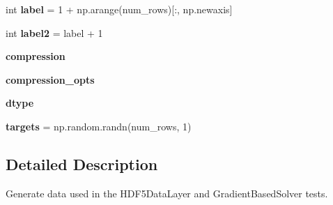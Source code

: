 \begin{DoxyCompactItemize}
int {\bfseries label} = 1 + np.\+arange(num\+\_\+rows)\mbox{[}\+:, np.\+newaxis\mbox{]}
\item 
\mbox{\label{namespacegenerate__sample__data_ad6ecf36c3dac6140a30b04fee35da3f2}} 
int {\bfseries label2} = label + 1
\item 
\mbox{\label{namespacegenerate__sample__data_aa357f9fa404423f5df718d8ba7bb6af7}} 
{\bfseries compression}
\item 
\mbox{\label{namespacegenerate__sample__data_a0f69c96856d7c4622a38b86687e8fa5e}} 
{\bfseries compression\+\_\+opts}
\item 
\mbox{\label{namespacegenerate__sample__data_a891ff21b3ec3fa799d70c71e543e3f12}} 
{\bfseries dtype}
\item 
\mbox{\label{namespacegenerate__sample__data_acb1ad2725591b770129e26512a718963}} 
{\bfseries targets} = np.\+random.\+randn(num\+\_\+rows, 1)
\end{DoxyCompactItemize}


\subsection{Detailed Description}
\begin{DoxyVerb}Generate data used in the HDF5DataLayer and GradientBasedSolver tests.
\end{DoxyVerb}
 